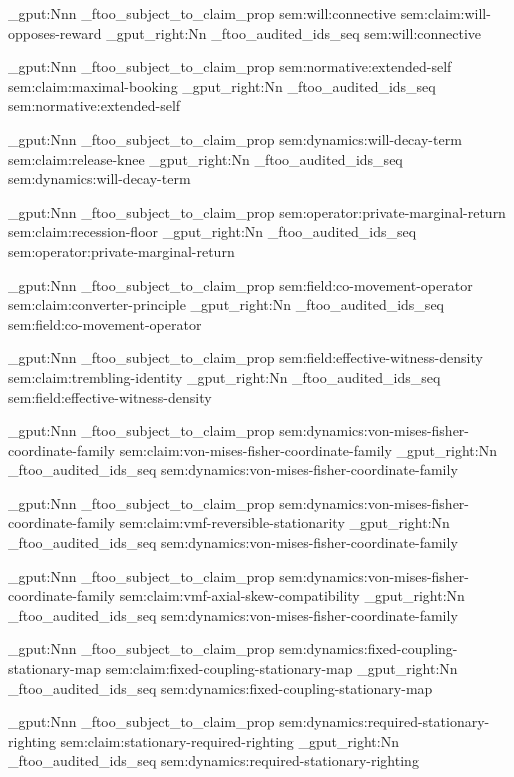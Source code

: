 \prop_gput:Nnn \g_ftoo_subject_to_claim_prop { sem:will:connective } { sem:claim:will-opposes-reward }
\seq_gput_right:Nn \g_ftoo_audited_ids_seq { sem:will:connective }

\prop_gput:Nnn \g_ftoo_subject_to_claim_prop { sem:normative:extended-self } { sem:claim:maximal-booking }
\seq_gput_right:Nn \g_ftoo_audited_ids_seq { sem:normative:extended-self }

\prop_gput:Nnn \g_ftoo_subject_to_claim_prop { sem:dynamics:will-decay-term } { sem:claim:release-knee }
\seq_gput_right:Nn \g_ftoo_audited_ids_seq { sem:dynamics:will-decay-term }

\prop_gput:Nnn \g_ftoo_subject_to_claim_prop { sem:operator:private-marginal-return } { sem:claim:recession-floor }
\seq_gput_right:Nn \g_ftoo_audited_ids_seq { sem:operator:private-marginal-return }

\prop_gput:Nnn \g_ftoo_subject_to_claim_prop { sem:field:co-movement-operator } { sem:claim:converter-principle }
\seq_gput_right:Nn \g_ftoo_audited_ids_seq { sem:field:co-movement-operator }

\prop_gput:Nnn \g_ftoo_subject_to_claim_prop { sem:field:effective-witness-density } { sem:claim:trembling-identity }
\seq_gput_right:Nn \g_ftoo_audited_ids_seq { sem:field:effective-witness-density }

\prop_gput:Nnn \g_ftoo_subject_to_claim_prop { sem:dynamics:von-mises-fisher-coordinate-family } { sem:claim:von-mises-fisher-coordinate-family }
\seq_gput_right:Nn \g_ftoo_audited_ids_seq { sem:dynamics:von-mises-fisher-coordinate-family }

\prop_gput:Nnn \g_ftoo_subject_to_claim_prop { sem:dynamics:von-mises-fisher-coordinate-family } { sem:claim:vmf-reversible-stationarity }
\seq_gput_right:Nn \g_ftoo_audited_ids_seq { sem:dynamics:von-mises-fisher-coordinate-family }

\prop_gput:Nnn \g_ftoo_subject_to_claim_prop { sem:dynamics:von-mises-fisher-coordinate-family } { sem:claim:vmf-axial-skew-compatibility }
\seq_gput_right:Nn \g_ftoo_audited_ids_seq { sem:dynamics:von-mises-fisher-coordinate-family }

\prop_gput:Nnn \g_ftoo_subject_to_claim_prop { sem:dynamics:fixed-coupling-stationary-map } { sem:claim:fixed-coupling-stationary-map }
\seq_gput_right:Nn \g_ftoo_audited_ids_seq { sem:dynamics:fixed-coupling-stationary-map }

\prop_gput:Nnn \g_ftoo_subject_to_claim_prop { sem:dynamics:required-stationary-righting } { sem:claim:stationary-required-righting }
\seq_gput_right:Nn \g_ftoo_audited_ids_seq { sem:dynamics:required-stationary-righting }

